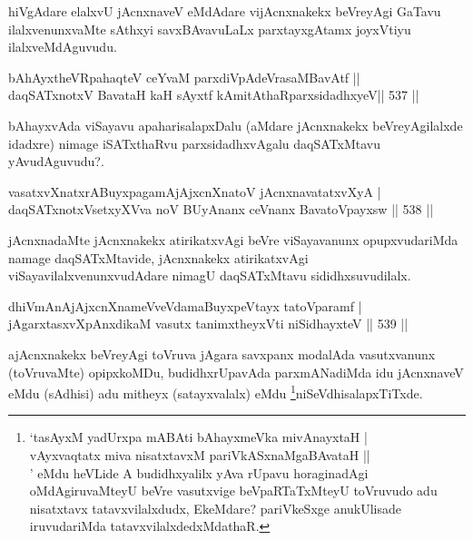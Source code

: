 \begin{artha}
hiVgAdare elalxvU jAcnxnaveV eMdAdare vijAcnxnakekx beVreyAgi GaTavu ilalxvenunxvaMte sAthxyi savxBAvavuLaLx parxtayxgAtamx joyxVtiyu ilalxveMdAguvudu.
\end{artha}

\begin{shl}
bAhAyxtheVR\s pahaqteV ceYvaM parxdiVpAdeVrasaMBavAtf ||  \\
daqSATxnotxV BavataH kaH sAyxtf \footnotemark[2]kAmitAthaRparxsidadhxyeV\hfill ||  537 ||  
\end{shl}

\begin{artha}
bAhayxvAda viSayavu apaharisalapxDalu (aMdare jAcnxnakekx beVreyAgilalxde idadxre) nimage iSATxthaRvu parxsidadhxvAgalu daqSATxMtavu yAvudAguvudu?.
\end{artha}


\begin{shl}
vasatxvXnatxrABuyxpagamAjAjxcnXnatoV jAcnxnavatatxvXyA | \\
daqSATxnotxV\s setxyXVva noV BUyAnanx ceVnanx BavatoV\s payxsw \hfill||  538 ||  
\end{shl}

\begin{artha}
jAcnxnadaMte jAcnxnakekx atirikatxvAgi beVre viSayavanunx opupxvudariMda namage daqSATxMtavide, jAcnxnakekx atirikatxvAgi viSayavilalxvenunxvudAdare nimagU daqSATxMtavu sididhxsuvudilalx.
\end{artha}


\begin{shl}
dhiVmAnAjAjxcnXnameVveVdamaBuyxpeVtayx tatoV\s paramf | \\
jAgarxtasxvXpAnxdikaM vasutx tanimxtheyxVti niSidhayxteV \hfill||  539 ||  
\end{shl}

\begin{artha}
ajAcnxnakekx beVreyAgi toVruva jAgara savxpanx modalAda vasutxvanunx (toVruvaMte) opipxkoMDu, budidhxrUpavAda parxmANadiMda idu jAcnxnaveV eMdu (sAdhisi) adu mitheyx (satayxvalalx) eMdu \footnote{`tasAyxM yadUrxpa mABAti bAhayxmeVka mivAnayxtaH |\\
vAyxvaqtatx miva nisatxtavxM pariVkASxnaMgaBAvataH ||\\' eMdu heVLide A budidhxyalilx yAva rUpavu horaginadAgi oMdAgiruvaMteyU beVre vasutxvige beVpaRTaTxMteyU toVruvudo adu nisatxtavx tatavxvilalxdudx, EkeMdare? pariVkeSxge anukUlisade iruvudariMda tatavxvilalxdedxMdathaR.}niSeVdhisalapxTiTxde.
\end{artha}

